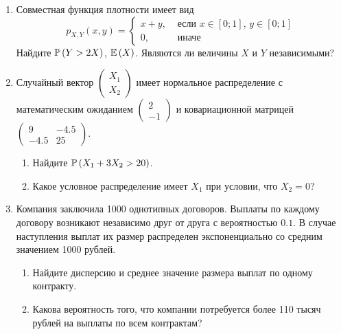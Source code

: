 \begin{enumerate}
\item Совместная функция плотности имеет вид
\[
p_{X,Y} \left(x,y\right)=
\begin{cases}
x+y, & \text{ если } x\in \left[0;1\right],\, y\in \left[0;1\right] \\
0, & \text{ иначе}
\end{cases}
\]
Найдите $\P\left(Y>2X\right)$, $\E\left(X\right)$.
Являются ли величины $X$ и $Y$ независимыми?
\item Случайный вектор  $\left(\begin{array}{c}
{X_{1} } \\ {X_{2} }
\end{array}\right)$  имеет нормальное распределение с
математическим ожиданием  $\left(\begin{array}{c} {2} \\ {-1}
\end{array}\right)$  и ковариационной матрицей
$\left(\begin{array}{cc} {9} & {-4.5} \\ {-4.5} & {25}
\end{array}\right)$.
\begin{enumerate}
\item Найдите  $\P\left(X_{1} +3X_{2} >20\right)$.
\item Какое условное распределение имеет $X_{1}$ при условии, что $X_{2}=0$?
\end{enumerate}

\item Компания заключила 1000 однотипных договоров. Выплаты по каждому договору
возникают независимо друг от друга с вероятностью $0.1$. В случае наступления выплат
их размер распределен экспоненциально со средним значением 1000 рублей.
\begin{enumerate}
\item Найдите дисперсию и среднее значение размера выплат по одному контракту.
\item Какова вероятность того, что компании потребуется более 110 тысяч рублей
на выплаты по всем контрактам?
\end{enumerate}


\end{enumerate}
